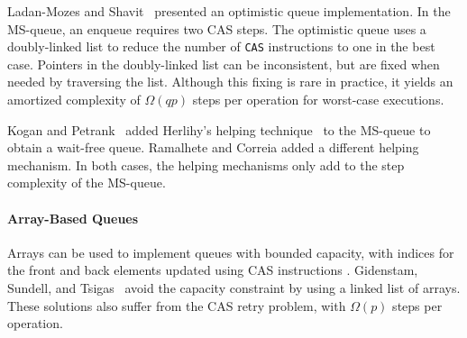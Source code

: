 Ladan-Mozes and Shavit~\cite{DBLP:journals/dc/Ladan-MozesS08}
presented an optimistic  queue implementation. 
In the MS-queue, an enqueue requires two CAS steps.
The optimistic queue uses a doubly-linked list to reduce the number of
\texttt{CAS} instructions to one in the best case. 
Pointers in the doubly-linked list can be inconsistent, but are fixed when needed by traversing the list.
Although this fixing is rare in practice, it yields an amortized complexity of $\Omega(qp)$ 
steps per operation for worst-case executions.

Kogan and Petrank~\cite{DBLP:conf/ppopp/KoganP11} 
added Herlihy's helping
technique~\cite{10.1145/114005.102808} to the MS-queue to obtain
a wait-free queue.
Ramalhete and Correia \cite{RC17} added a different helping mechanism.
In both cases, the helping mechanisms only add to the step complexity of the MS-queue.

\paragraph{Array-Based Queues}
Arrays can be used to implement queues with bounded capacity, with indices
for the front and back elements updated using CAS instructions 
\cite{DBLP:conf/iceccs/ColvinG05,DBLP:conf/icdcn/Shafiei09,DBLP:conf/spaa/TsigasZ01}.
Gidenstam, Sundell, and Tsigas~\cite{DBLP:conf/opodis/GidenstamST10} avoid
the capacity constraint by using a linked list of arrays.
These solutions also suffer from the CAS retry problem, with $\Omega(p)$ steps per operation.

